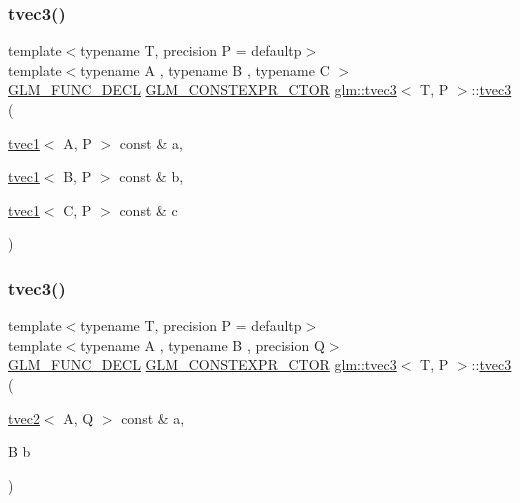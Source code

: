 \subsubsection{\texorpdfstring{tvec3()}{tvec3()}\hspace{0.1cm}{\footnotesize\ttfamily [8/23]}}
{\footnotesize\ttfamily template$<$typename T, precision P = defaultp$>$ \\
template$<$typename A , typename B , typename C $>$ \\
\mbox{\hyperlink{setup_8hpp_ab2d052de21a70539923e9bcbf6e83a51}{G\+L\+M\+\_\+\+F\+U\+N\+C\+\_\+\+D\+E\+CL}} \mbox{\hyperlink{setup_8hpp_ad34178a09666081abdb573c14d1f4a5a}{G\+L\+M\+\_\+\+C\+O\+N\+S\+T\+E\+X\+P\+R\+\_\+\+C\+T\+OR}} \mbox{\hyperlink{structglm_1_1tvec3}{glm\+::tvec3}}$<$ T, P $>$\+::\mbox{\hyperlink{structglm_1_1tvec3}{tvec3}} (\begin{DoxyParamCaption}\item[{\mbox{\hyperlink{structglm_1_1tvec1}{tvec1}}$<$ A, P $>$ const \&}]{a,  }\item[{\mbox{\hyperlink{structglm_1_1tvec1}{tvec1}}$<$ B, P $>$ const \&}]{b,  }\item[{\mbox{\hyperlink{structglm_1_1tvec1}{tvec1}}$<$ C, P $>$ const \&}]{c }\end{DoxyParamCaption})}

\mbox{\label{structglm_1_1tvec3_a94293c28f040fc93d3f22cbb9d8b6a54}} 
\subsubsection{\texorpdfstring{tvec3()}{tvec3()}\hspace{0.1cm}{\footnotesize\ttfamily [9/23]}}
{\footnotesize\ttfamily template$<$typename T, precision P = defaultp$>$ \\
template$<$typename A , typename B , precision Q$>$ \\
\mbox{\hyperlink{setup_8hpp_ab2d052de21a70539923e9bcbf6e83a51}{G\+L\+M\+\_\+\+F\+U\+N\+C\+\_\+\+D\+E\+CL}} \mbox{\hyperlink{setup_8hpp_ad34178a09666081abdb573c14d1f4a5a}{G\+L\+M\+\_\+\+C\+O\+N\+S\+T\+E\+X\+P\+R\+\_\+\+C\+T\+OR}} \mbox{\hyperlink{structglm_1_1tvec3}{glm\+::tvec3}}$<$ T, P $>$\+::\mbox{\hyperlink{structglm_1_1tvec3}{tvec3}} (\begin{DoxyParamCaption}\item[{\mbox{\hyperlink{structglm_1_1tvec2}{tvec2}}$<$ A, Q $>$ const \&}]{a,  }\item[{B}]{b }\end{DoxyParamCaption})}



